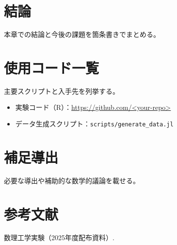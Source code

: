 \documentclass[a4paper,11pt]{ltjsarticle}
\begin{document}
\section{結論}
本章での結論と今後の課題を箇条書きでまとめる。

\appendix
\section{使用コード一覧}
主要スクリプトと入手先を列挙する。
\begin{itemize}
  \item 実験コード（R）：\url{https://github.com/<your-repo>}
  \item データ生成スクリプト：\texttt{scripts/generate\_data.jl}
\end{itemize}

\section{補足導出}
必要な導出や補助的な数学的議論を載せる。

\section*{参考文献}
\begin{thebibliography}{9}
 数理工学実験（2025年度配布資料）.
\end{thebibliography}
\end{document}
